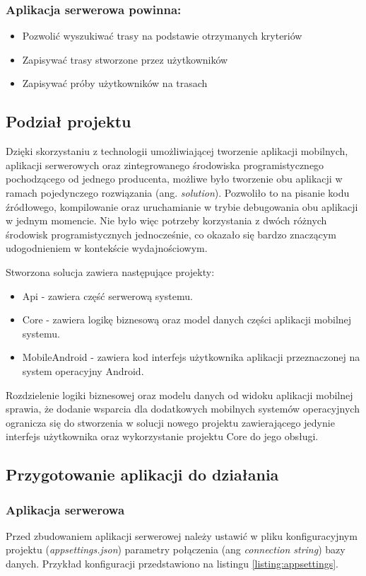 \subsubsection{Aplikacja serwerowa powinna:}
\begin{itemize}
\item{Pozwolić wyszukiwać trasy na podstawie otrzymanych kryteriów}
\item{Zapisywać trasy stworzone przez użytkowników}
\item{Zapisywać próby użytkowników na trasach}
\end{itemize}

\subsection{Podział projektu}
Dzięki skorzystaniu z technologii umożliwiającej tworzenie aplikacji mobilnych, aplikacji serwerowych oraz zintegrowanego środowiska programistycznego pochodzącego od jednego producenta, możliwe było tworzenie obu aplikacji w ramach pojedynczego rozwiązania (ang. \textit{solution}). Pozwoliło to na pisanie kodu źródłowego, kompilowanie oraz uruchamianie w trybie debugowania obu aplikacji w jednym momencie. Nie było więc potrzeby korzystania z dwóch różnych środowisk programistycznych jednocześnie, co okazało się bardzo znaczącym udogodnieniem w kontekście wydajnościowym.

Stworzona solucja zawiera następujące projekty:
\begin{itemize}
\item{Api} - zawiera część serwerową systemu.
\item{Core} - zawiera logikę biznesową oraz model danych części aplikacji mobilnej systemu.
\item{MobileAndroid} - zawiera kod interfejs użytkownika aplikacji przeznaczonej na system operacyjny Android.
\end{itemize}
Rozdzielenie logiki biznesowej oraz modelu danych od widoku aplikacji mobilnej sprawia, że dodanie wsparcia dla dodatkowych mobilnych systemów operacyjnych ogranicza się do stworzenia w solucji nowego projektu zawierającego jedynie interfejs użytkownika oraz wykorzystanie projektu Core do jego obsługi.

\subsection{Przygotowanie aplikacji do działania}
\subsubsection{Aplikacja serwerowa}
Przed zbudowaniem aplikacji serwerowej należy ustawić w pliku konfiguracyjnym projektu (\textit{appsettings.json}) parametry połączenia (ang \textit{connection string}) bazy danych. Przykład konfiguracji przedstawiono na listingu \ref{listing:appsettings}.

